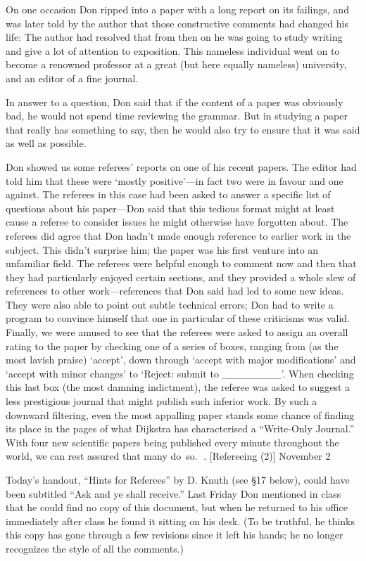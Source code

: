 On one occasion Don ripped into a paper with a long report on its
failings, and was later told by the author that those constructive
comments had changed his life: The author had resolved that from then
on he was going to study writing and give a lot of attention to exposition.
This nameless individual
went on to become a renowned professor at a great (but here equally
nameless) university, and an editor of a fine journal.

In answer to a question, Don said that if the content of a paper was
obviously bad, he would not spend time reviewing the grammar. But in
studying a paper that really has something to say, then he would also
try to ensure that it was said as well as possible.

Don showed us some referees' reports on one of his recent papers. The
editor had told him that these were `mostly positive'---in fact two
were in favour and one against. The referees in this case had been
asked to answer a specific list of questions about his paper---Don
said that this tedious format might at least cause a referee to consider
issues he might otherwise have forgotten about. The referees did
agree that Don hadn't made enough reference to earlier work in the
subject. This didn't surprise him; the paper was his first venture into
an unfamiliar field. The referees were helpful enough to comment now
and then that they had particularly enjoyed certain sections, and they
provided a whole slew of references to other work---references that
Don said had led to some new ideas. They were also able to point out subtle
technical errors; Don had to write a program to convince
himself that one in particular of these criticisms was valid. Finally, we were
amused to see that the referees were asked to assign an overall rating
to the paper by checking one of a series of boxes, ranging from (as
the most lavish praise) `accept', down through `accept with major
modifications' and `accept with minor changes' to `Reject: submit to
\_\_\_\_\_\_\_\_'. When checking this last box (the most damning
indictment), the referee was asked to suggest a less prestigious
journal that might publish such inferior work. By such a downward
filtering, even the most appalling paper stands some chance of finding
its place in the pages of what Dijkstra has characterised a
``Write-Only Journal.'' With four new scientific papers being published
every minute throughout the world, we can rest assured that many do~so.
. [Refereeing (2)] \tll November 2

Today's handout, ``Hints for Referees'' by D. Knuth (see \S{17} below),
 could have been
subtitled ``Ask and ye shall receive.'' Last Friday Don mentioned in class
that he could find no copy of this document, but when he returned to his
office immediately after class he found it sitting on his desk.  (To be truthful, he
thinks this copy has gone through a few revisions since it left his hands;
he no longer recognizes the style of all the comments.)

